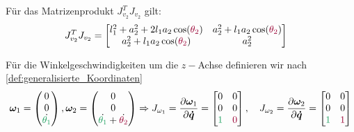 \documentclass[a4paper, 12pt]{scrartcl}
\newcommand{\gruen}[2][cadGreen]{\textcolor{#1}{#2}}
\newcommand{\dunkelrot}[2][dunkelrot]{\textcolor{#1}{#2}}
\begin{document}
Für das Matrizenprodukt $J_{v_2}^T J_{v_2}$ gilt:
\begin{align*}
    J_{v_2}^T J_{v_2} 
    &=
    \begin{bmatrix}
        l_1^2 + a_2^2 + 2 l_1 a_2  \cos(\dunkelrot{\theta_{2}})
        & 
        a_2^2 + l_1 a_2  \cos(\dunkelrot{\theta_{2}}) 
        \\
        a_2^2 + l_1 a_2  \cos(\dunkelrot{\theta_{2}})
        & 
        a_2^2
    \end{bmatrix}
\end{align*}

Für die Winkelgeschwindigkeiten um die $z-$Achse definieren 
wir nach \ref{def:generalisierte_Koordinaten} 
%
\begin{align*}
    \bm{\omega}_1 
    = 
    \begin{pmatrix}
        0 
        \\
        0 
        \\
        \dot{\gruen{\theta_1}}
    \end{pmatrix},
    \bm{\omega}_2 
    = 
    \begin{pmatrix} 
        0 
        \\ 
        0 
        \\ 
        \dot{\gruen{\theta_1}} + \dot{\dunkelrot{\theta_2}}
    \end{pmatrix}
    \Rightarrow
    J_{\omega_1} 
    =
    \frac{\partial \bm{\omega}_1}{\partial \bm{\dot{q}}}
    =
    \begin{bmatrix}
        0 & 0 \\
        0 & 0 \\
        \gruen{1} & \dunkelrot{0}
    \end{bmatrix},
    \quad
    J_{\omega_2} 
    =
    \frac{\partial \bm{\omega}_2}{\partial \bm{\dot{q}}}
    =
    \begin{bmatrix}
        0 & 0 \\
        0 & 0 \\
        \gruen{1} & \dunkelrot{1}
    \end{bmatrix}
\end{align*}
\end{document}
